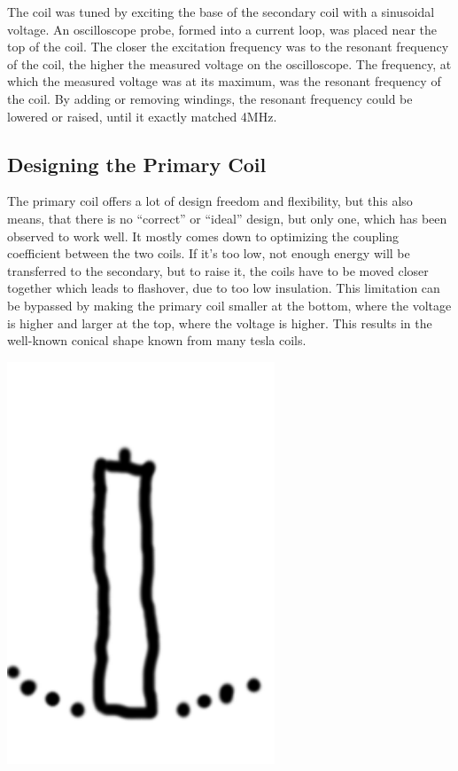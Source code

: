 The coil was tuned by exciting the base of the secondary coil with a sinusoidal voltage. An oscilloscope probe, formed into a current loop, was placed near the top of the coil. The closer the excitation frequency was to the resonant frequency of the coil, the higher the measured voltage on the oscilloscope. The frequency, at which the measured voltage was at its maximum, was the resonant frequency of the coil. By adding or removing windings, the resonant frequency could be lowered or raised, until it exactly matched 4MHz. %

\subsection{Designing the Primary Coil}
\label{sec:designing-the-primary}

The primary coil offers a lot of design freedom and flexibility, but this also means, that there is no \enquote{correct} or \enquote{ideal} design, but only one, which has been observed to work well. It mostly comes down to optimizing the coupling coefficient between the two coils. If it's too low, not enough energy will be transferred to the secondary, but to raise it, the coils have to be moved closer together which leads to flashover, due to too low insulation. %
This limitation can be bypassed by making the primary coil smaller at the bottom, where the voltage is higher and larger at the top, where the voltage is higher. This results in the well-known conical shape known from many tesla coils.

\begin{marginfigure}
\centering
\includegraphics[width=0.6\textwidth]{simon/resources/teslaCoilSketch.png}
\end{marginfigure}

